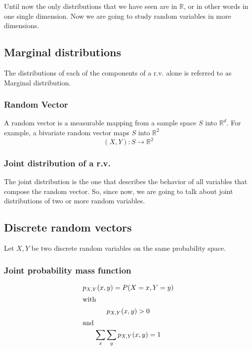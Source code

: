 Until now the only distributions that we have seen are in $\mathbb{R}$, or in
other words in one single dimension. Now we are going to study random variables
in more dimensions.

\subsection{Marginal distributions} %
\label{sub:marginal_distributions}


The distributions of each of the components of a r.v. alone is referred to as
Marginal distribution.

 \subsubsection{Random Vector}
 A random vector is a measurable mapping from a sample space $S$ into
 $\mathbb{R}^d$. For example, a bivariate random vector maps $S$ into
 $\mathbb{R}^2$
 \begin{equation*}
     (X,Y):S\rightarrow\mathbb{R}^2
 \end{equation*}

\subsubsection{Joint distribution of a r.v.} %
\label{ssub:joint_distribution_of_a_r_v_}

The joint distribution is the one that describes the behavior of all variables
that compose the random vector. So, since now, we are going to talk about joint
distributions of two or more random variables.

\subsection{Discrete random vectors} %
\label{sub:discrete_random_vectors}

Let $X, Y$ be two discrete random variables on the same probability space.

\subsubsection{Joint probability mass function} %
\label{ssub:joint_probability_mass_function}

\begin{gather*}
    p_{X,Y}(x,y)=P(X=x,Y=y)\\
    \intertext{with}
    p_{X,Y}(x,y)>0\\
    \intertext{and}
    \sum_x\sum_yp_{X,Y}(x,y)=1
\end{gather*}

